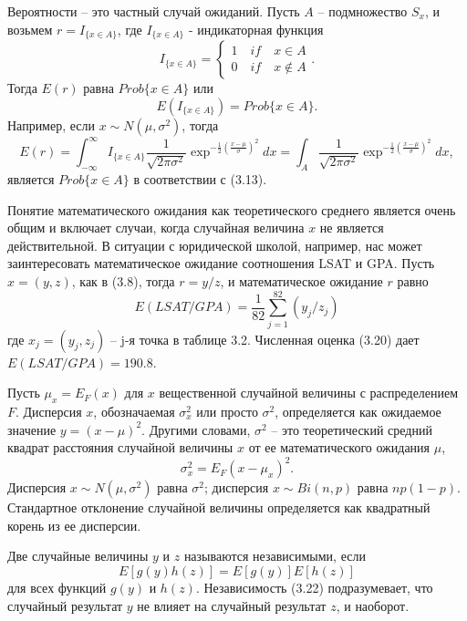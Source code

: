 Вероятности -- это частный случай ожиданий. Пусть $A$ -- подмножество $S_x$, и возьмем $r = I_{\{x\in A\}}$, где $I_{\{x\in A\}}$ - индикаторная функция
\begin{equation}
    I_{\{x\in A\}}=\begin{cases}
      1\quad if \quad x\in A\\
      0\quad if \quad x\not\in A
    \end{cases}.
\end{equation}
Тогда $E(r)$ равна $Prob\{x\in A\}$ или 
\begin{equation}
    E(I_{\{x\in A\}})=Prob\{x\in A\}.
\end{equation}
Например, если $x\sim N(\mu, \sigma^2)$, тогда
\begin{equation}
    E(r)=\int_{-\infty}^\infty I_{\{x\in A\}}\frac{1}{\sqrt{2\pi\sigma^2}}\exp^{-\frac{1}{2}(\frac{x-\mu}{\sigma})^2}dx=
    \int_{A} \frac{1}{\sqrt{2\pi\sigma^2}}\exp^{-\frac{1}{2}(\frac{x-\mu}{\sigma})^2}dx,
\end{equation}
является $Prob\{x\in A\}$ в соответствии с (3.13).

Понятие математического ожидания как теоретического среднего является очень общим и включает случаи, когда случайная величина $x$ не является действительной. В ситуации с юридической школой, например, нас может заинтересовать математическое ожидание соотношения LSAT и GPA. Пусть $x = (y, z)$, как в (3.8), тогда $r = y/z$, и математическое ожидание $r$ равно 
\begin{equation}
    E(LSAT/GPA)=\frac{1}{82}\sum_{j=1}^82(y_j/z_j)
\end{equation}
где $x_j = (y_j, z_j)$ -- j-я точка в таблице 3.2. Численная оценка (3.20) дает $E(LSAT/GPA) = 190.8$. 

Пусть $\mu_x = E_F(x)$ для $x$ вещественной случайной величины с распределением $F$. Дисперсия $x$, обозначаемая $\sigma^2_x$ или просто $\sigma^2$, определяется как ожидаемое значение $y = (x- \mu)^2$. Другими словами, $\sigma^2$ -- это теоретический средний квадрат расстояния случайной величины $x$ от ее математического ожидания $\mu$, 
\begin{equation}
    \sigma^2_x = E_F(x-\mu_x)^2.
\end{equation}
Дисперсия $x\sim N (\mu, \sigma^2)$ равна $\sigma^2$; дисперсия $x\sim Bi (n, p)$ равна $np (1 - p)$. Стандартное отклонение случайной величины определяется как квадратный корень из ее дисперсии. 

Две случайные величины $y$ и $z$ называются независимыми, если 
\begin{equation}
    E[g(y)h(z)]=E[g(y)]E[h(z)]
\end{equation}
для всех функций $g(y)$ и $h(z)$. Независимость (3.22) подразумевает, что случайный результат $y$ не влияет на случайный результат $z$, и наоборот. 

